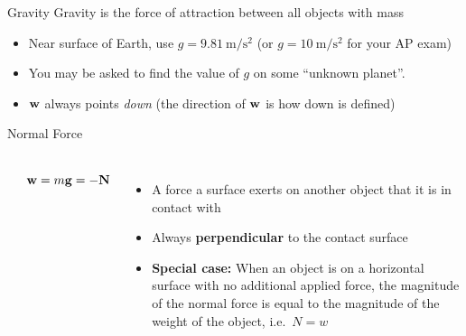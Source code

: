 \documentclass[12pt,compress,aspectratio=169]{beamer}
\newcommand{\mb}[1]{\ensuremath\mathbf{#1}}
\newcommand{\eq}[2]{\vspace{#1}{\Large\begin{displaymath}#2\end{displaymath}}}
\begin{document}
\begin{frame}{Gravity}
  Gravity is the force of attraction between all objects with mass
    
  \eq{-.2in}{
    \boxed{\mb{w}=m\mb{g}}
  }
  \begin{itemize}
  \item\vspace{-.15in}Near surface of Earth, use
    $g=\SI{9.81}{\metre/\second\squared}$ (or
    $g=\SI{10}{\metre/\second\squared}$ for your AP exam)
  \item You may be asked to find the value of $g$ on some ``unknown planet''.
  \item $\mb{w}$ always points \emph{down} (the direction of $\mb{w}$ is how
    down is defined)
%
  \end{itemize}    
\end{frame}



\begin{frame}{Normal Force}
  \begin{columns}
    \begin{center}
    \end{center}
    \begin{displaymath}
      \mb{w}=m\mb{g}=-\mb{N}
    \end{displaymath}
    
    \begin{itemize}
    \item A force a surface exerts on another object that it is in contact with
    \item Always \textbf{perpendicular} to the contact surface
    \item\textbf{Special case:} When an object is on a horizontal surface
      with no additional applied force, the magnitude of the normal force is
      equal to the magnitude of the weight of the object, i.e.\ $N=w$
    \end{itemize}
  \end{columns}
\end{frame}
\end{document}
